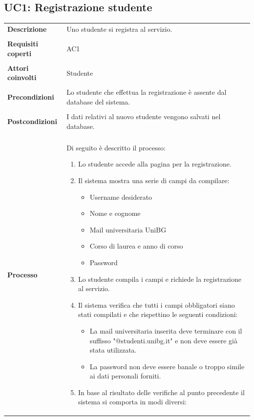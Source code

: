 \documentclass[10pt,a4paper]{report}
\begin{document}
	\subsection{UC1: Registrazione studente}
	\begin{tabular}{lp{}}
		\textbf{Descrizione}&Uno studente si registra al servizio.\\
		\\
		\textbf{Requisiti coperti}&AC1\\
		\\
		\textbf{Attori coinvolti}&Studente\\
		\\
		\textbf{Precondizioni}&Lo studente che effettua la registrazione è assente dal database del sistema.\\
		\\
		\textbf{Postcondizioni}&I dati relativi al nuovo studente vengono salvati nel database.\\
		\\
		\textbf{Processo}&Di seguito è descritto il processo:
		\begin{enumerate}
			\item Lo studente accede alla pagina per la registrazione.
			\item Il sistema mostra una serie di campi da compilare:
			\begin{itemize}
				\item Username desiderato
				\item Nome e cognome
				\item Mail universitaria UniBG
				\item Corso di laurea e anno di corso
				\item Password
			\end{itemize}
			\item Lo studente compila i campi e richiede la registrazione al servizio.
			\item Il sistema verifica che tutti i campi obbligatori siano stati compilati e che rispettino le seguenti condizioni:
			\begin{itemize}
				\item La mail universitaria inserita deve terminare con il suffisso "@studenti.unibg.it" e non deve essere già stata utilizzata.
				\item La password non deve essere banale o troppo simile ai dati personali forniti.
			\end{itemize}
			\item In base al risultato delle verifiche al punto precedente il sistema si comporta in modi diversi:

\end{enumerate}
\end{tabular}
\end{document}
